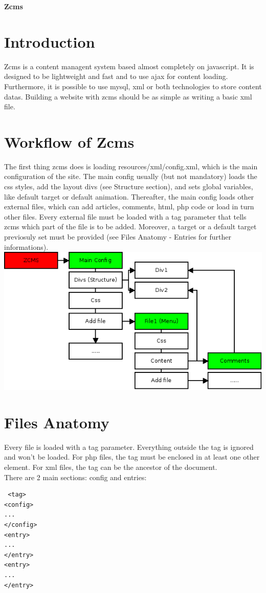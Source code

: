 \documentclass[a4paper,12pt]{article}
\begin{document}
\begin{center}
 \huge \bfseries {Zcms}
\\[0.5cm]
\end{center}
\section{Introduction}
Zcms is a content managent system based almost completely on javascript. It is designed to be lightweight and fast and to use ajax for content loading. Furthermore, it is possible to use mysql, xml or both technologies to store content datas. Building a website with zcms should be as simple as writing a basic xml file.
\section{Workflow of Zcms}
The first thing zcms does is loading resources/xml/config.xml, which is the main configuration of the site. The main config usually (but not mandatory) loads the css styles, add the layout divs (see Structure section), and sets global variables, like default target or default animation. Thereafter, the main config loads other external files, which can add articles, comments, html, php code or load in turn other files. Every external file must be loaded with a tag parameter that tells zcms which part of the file is to be added. Moreover, a target or a default target previosuly set must be provided (see Files Anatomy - Entries for further informations).
\includegraphics[scale=0.7]{Diagramma_zcms.png}
\section{Files Anatomy}
Every file is loaded with a tag parameter. Everything outside the tag is ignored and won't be loaded. For php files, the tag must be enclosed in at least one other element. For xml files, the tag can be the ancestor of the document.\\
There are 2 main sections: config and entries:
\begin{lstlisting}
 <tag>
<config>
...
</config>
<entry>
...
</entry>
<entry>
...
</entry>
\end{lstlisting}
\end{document}
